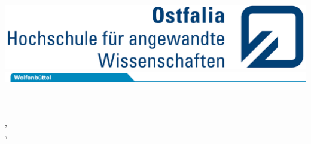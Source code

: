 % 
%
\begin{titlepage}
	\vspace*{-3.0cm}
	\hspace*{ 6.90cm}\includegraphics[scale=0.93]{../ostfalia/Ostfalia_LS_RGB_klein.jpg}\\
	\hspace*{-1.00cm}\includegraphics[scale=1.20]{../ostfalia/Reiter_Wolfen_RGB_174mm.jpg}\\
	
	\\
	
	\hrulefill\\
	
	\begin{flushleft}
	{\Large\textsf{\authorMarco, \matrNumberMarco\\}}
	{\Large\textsf{\authorNiklas, \matrNumberNiklas\\}}
	\end{flushleft}
	
	
	
	
	\begin{center}
	\vspace{2em}
	\textbf{
	\textsf{\huge\titel \\[0.3ex]}}
	\textsf{\hspace*{0.5cm}\large \subtitel \\[0.05cm]}
	\end{center}
	

\end{titlepage}
